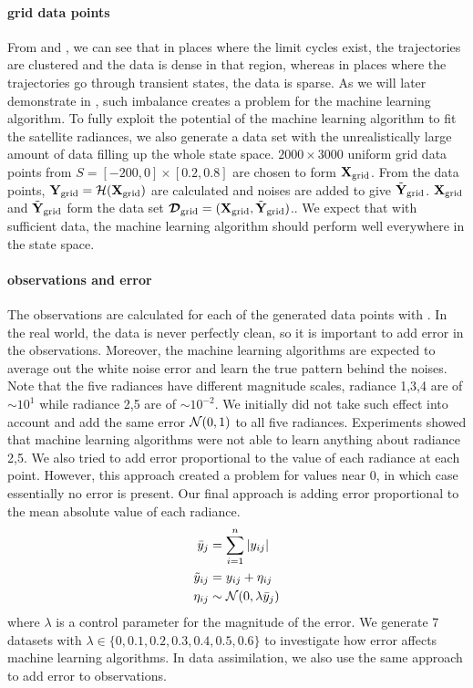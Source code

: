 \paragraph{grid data points} From  and , we can see that in places where the limit cycles exist, the trajectories are clustered and the data is dense in that region, whereas in places where the trajectories go through transient states, the data is sparse. As we will later demonstrate in , such imbalance creates a problem for the machine learning algorithm. To fully exploit the potential of the machine learning algorithm to fit the satellite radiances, we also generate a data set with the unrealistically large amount of data filling up the whole state space. $2000\times 3000$ uniform grid data points from $S=[-200,0]\times[0.2,0.8]$ are chosen to form $\textbf{X}_{\text{grid}}$. From the data points, $\textbf{Y}_{\text{grid}}=\mathcal{H}(\textbf{X}_{\text{grid}})$ are calculated and noises are added to give $\tilde{\textbf{Y}}_{\text{grid}}$. $\textbf{X}_{\text{grid}}$ and $\tilde{\textbf{Y}}_{\text{grid}}$ form the data set $\bm{\mathcal{D}}_{\text{grid}}=(\textbf{X}_{\text{grid}},\tilde{\textbf{Y}}_{\text{grid}})$.. We expect that with sufficient data, the machine learning algorithm should perform well everywhere in the state space.

\paragraph{observations and error} The observations are calculated for each of the generated data points with . In the real world, the data is never perfectly clean, so it is important to add error in the observations. Moreover, the machine learning algorithms are expected to average out the white noise error and learn the true pattern behind the noises. Note that the five radiances have different magnitude scales, radiance 1,3,4 are of $\sim 10^1$ while radiance 2,5 are of $\sim 10^{-2}$. We initially did not take such effect into account and add the same error $\mathcal{N}(0,1)$ to all five radiances. Experiments showed that machine learning algorithms were not able to learn anything about radiance 2,5. We also tried to add error proportional to the value of each radiance at each point. However, this approach created a problem for values near $0$, in which case essentially no error is present. Our final approach is adding error proportional to the mean absolute value of each radiance.
\begin{align}
\bar{y}_j & = \sum_{i=1}^n | y_{ij} | \label{def:ybar}\\
\tilde{y}_{ij} &= y_{ij} + \eta_{ij} \label{def:ytilde}\\
\eta_{ij} &\sim \mathcal{N}(0,\lambda \bar{y}_j) \label{def:eta}
\end{align}
where $\lambda$ is a control parameter for the magnitude of the error. We generate 7 datasets with $\lambda \in \{ 0,0.1,0.2,0.3,0.4,0.5,0.6\}$ to investigate how error affects machine learning algorithms. In data assimilation, we also use the same approach to add error to observations.

